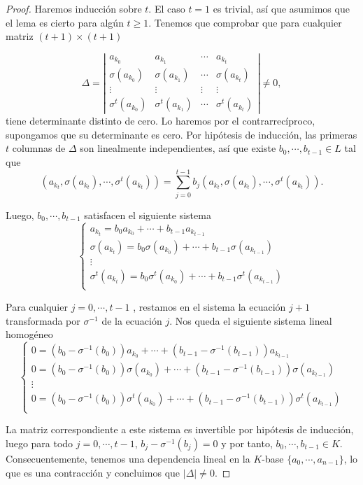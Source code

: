\begin{proof}
    Haremos inducción sobre $t$. El caso $t=1$ es trivial, así que asumimos que el lema es cierto para algún $t \geq 1$. Tenemos que comprobar que para cualquier matriz $(t+1) \times (t+1)$

    \[ \Delta = \left| \begin{array}{cccc}
	a_{k_0} & a_{k_1} & \cdots & a_{k_t}  \\
	\sigma(a_{k_0}) & \sigma(a_{k_1}) & \cdots & \sigma(a_{k_t})  \\
    \vdots & \vdots  & \vdots & \vdots  \\
	\sigma^{t}(a_{k_0}) & \sigma^{t}(a_{k_1}) & \cdots & \sigma^{t}(a_{k_t})  
			\end{array} 
	\right| \neq 0 ,
\]
tiene determinante distinto de cero. Lo haremos por el contrarrecíproco, supongamos que su determinante es cero. Por hipótesis de inducción, las primeras $t$ columnas de $\Delta$ son linealmente independientes, así que existe $b_0,\cdots,b_{t-1} \in L$ tal que 
\[ (a_{k_t},\sigma(a_{k_t}),\cdots,\sigma^t(a_{k_t})) = \sum_{j=0}^{t-1} b_j(a_{k_t},\sigma(a_{k_t}),\cdots,\sigma^t(a_{k_t})).\]

Luego, $b_0,\cdots,b_{t-1}$ satisfacen el siguiente sistema
 \[  \left\{ \begin{array}{l}
       a_{k_t} = b_0a_{k_0} + \cdots + b_{t-1}a_{k_{t-1}} \\
       \sigma(a_{k_t}) = b_0 \sigma(a_{k_0}) + \cdots + b_{t-1} \sigma(a_{k_{t-1}}) \\
       \vdots \\
       \sigma^t(a_{k_t}) = b_0 \sigma^t(a_{k_0}) + \cdots + b_{t-1} \sigma^t(a_{k_{t-1}}) \\
             \end{array}
   \right. \]

Para cualquier $j = 0,\cdots,t-1$ , restamos en el sistema la ecuación $j+1$ transformada por $\sigma^{-1}$ de la ecuación $j$. Nos queda el siguiente sistema lineal homogéneo
 \[  \left\{ \begin{array}{l}
      0 = (b_0-\sigma^{-1}(b_0))a_{k_0} + \cdots + (b_{t-1}-\sigma^{-1}(b_{t-1}))a_{k_{t-1}} \\
       0 = (b_0-\sigma^{-1}(b_0))\sigma(a_{k_0}) + \cdots + (b_{t-1}-\sigma^{-1}(b_{t-1}))\sigma(a_{k_{t-1}}) \\
       \vdots \\
       0 = (b_0-\sigma^{-1}(b_0))\sigma^t(a_{k_0}) + \cdots + (b_{t-1}-\sigma^{-1}(b_{t-1}))\sigma^t(a_{k_{t-1}}) \\
             \end{array}
   \right. \]

La matriz correspondiente a este sistema es invertible por hipótesis de inducción, luego para todo $j = 0,\cdots,t-1$, 
$b_j- \sigma^{-1}(b_j) = 0$ y por tanto, $b_0,\cdots,b_{t-1} \in K$. Consecuentemente, tenemos una dependencia lineal en la $K$-base   $\{a_0,\cdots,a_{n-1} \}$, lo que es una contracción y concluimos que $\mid \Delta \mid \neq 0$.
\end{proof}

